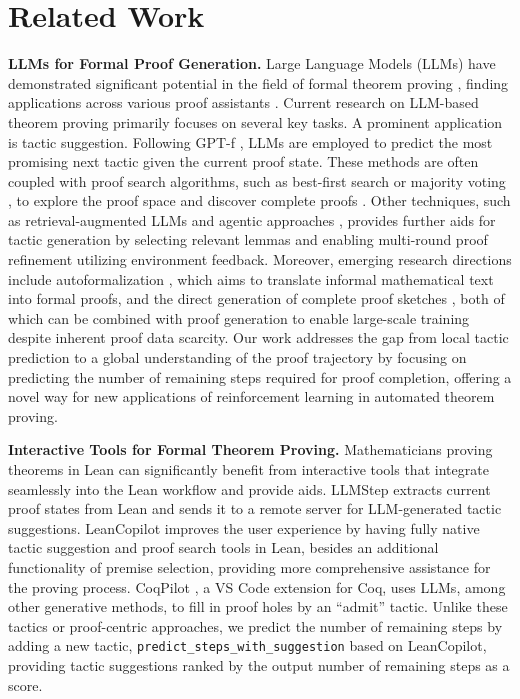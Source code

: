 \section{Related Work}
\label{sec:related}

\textbf{LLMs for Formal Proof Generation.} Large Language Models (LLMs) have demonstrated significant potential in the field of formal theorem proving \citep{yang2024formalmathematicalreasoningnew}, finding applications across various proof assistants \citep{yang2024leandojo, song2024largelanguagemodelscopilots, lama2024benchmarking}. Current research on LLM-based theorem proving primarily focuses on several key tasks. A prominent application is tactic suggestion. Following GPT-f \citep{polu2020generative}, LLMs are employed to predict the most promising next tactic given the current proof state. These methods are often coupled with proof search algorithms, such as best-first search \citep{yang2024leandojo} or majority voting \citep{zhou2024don}, to explore the proof space and discover complete proofs \citep{wu2024inference}. Other techniques, such as retrieval-augmented LLMs \citep{yang2024leandojo} and agentic approaches \citep{thakur2024incontextlearningagentformal}, provides further aids for tactic generation by selecting relevant lemmas and enabling multi-round proof refinement utilizing environment feedback. Moreover, emerging research directions include autoformalization  \citep{wu2022autoformalization,jiang2023multilingual}, which aims to translate informal mathematical text into formal proofs, and the direct generation of complete proof sketches  \citep{jiang2022draft, wang2024proving}, both of which can be combined with proof generation to enable large-scale training despite inherent proof data scarcity. Our work addresses the gap from local tactic prediction to a global understanding of the proof trajectory by focusing on predicting the number of remaining steps required for proof completion, offering a novel way for new applications of reinforcement learning in automated theorem proving.

\textbf{Interactive Tools for Formal Theorem Proving.} Mathematicians proving theorems in Lean can significantly benefit from interactive tools that integrate seamlessly into the Lean workflow and provide aids.
LLMStep \citep{welleck2023llmstep} extracts current proof states from Lean and sends it to a remote server for LLM-generated tactic suggestions. 
LeanCopilot \citep{song2024largelanguagemodelscopilots} improves the user experience by having fully native tactic suggestion and proof search tools in Lean, besides an additional functionality of premise selection, providing more comprehensive assistance for the proving process. 
CoqPilot \citep{Kozyrev_2024}, a VS Code extension for Coq, uses LLMs, among other generative methods, to fill in proof holes by an ``admit'' tactic.
Unlike these tactics or proof-centric approaches, we predict the number of remaining steps by adding a new tactic, \texttt{predict\_steps\_with\_suggestion} based on LeanCopilot, providing tactic suggestions ranked by the output number of remaining steps as a score.

